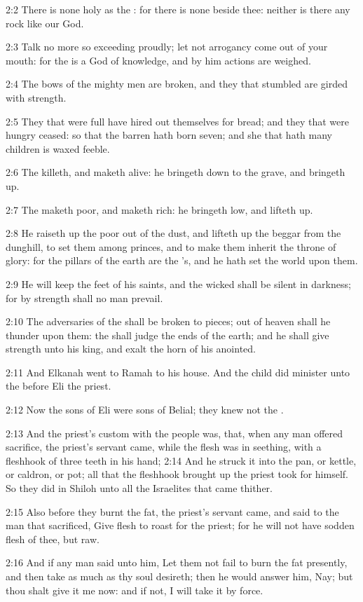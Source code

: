 2:2 There is none holy as the \LORD: for there is none beside thee: neither is there any rock like our God.

2:3 Talk no more so exceeding proudly; let not arrogancy come out of your mouth: for the \LORD is a God of knowledge, and by him actions are weighed.

2:4 The bows of the mighty men are broken, and they that stumbled are girded with strength.

2:5 They that were full have hired out themselves for bread; and they that were hungry ceased: so that the barren hath born seven; and she that hath many children is waxed feeble.

2:6 The \LORD killeth, and maketh alive: he bringeth down to the grave, and bringeth up.

2:7 The \LORD maketh poor, and maketh rich: he bringeth low, and lifteth up.

2:8 He raiseth up the poor out of the dust, and lifteth up the beggar from the dunghill, to set them among princes, and to make them inherit the throne of glory: for the pillars of the earth are the \LORD's, and he hath set the world upon them.

2:9 He will keep the feet of his saints, and the wicked shall be silent in darkness; for by strength shall no man prevail.

2:10 The adversaries of the \LORD shall be broken to pieces; out of heaven shall he thunder upon them: the \LORD shall judge the ends of the earth; and he shall give strength unto his king, and exalt the horn of his anointed.

2:11 And Elkanah went to Ramah to his house. And the child did minister unto the \LORD before Eli the priest.

2:12 Now the sons of Eli were sons of Belial; they knew not the \LORD.

2:13 And the priest's custom with the people was, that, when any man offered sacrifice, the priest's servant came, while the flesh was in seething, with a fleshhook of three teeth in his hand; 2:14 And he struck it into the pan, or kettle, or caldron, or pot; all that the fleshhook brought up the priest took for himself. So they did in Shiloh unto all the Israelites that came thither.

2:15 Also before they burnt the fat, the priest's servant came, and said to the man that sacrificed, Give flesh to roast for the priest; for he will not have sodden flesh of thee, but raw.

2:16 And if any man said unto him, Let them not fail to burn the fat presently, and then take as much as thy soul desireth; then he would answer him, Nay; but thou shalt give it me now: and if not, I will take it by force.

